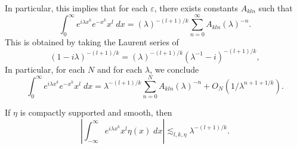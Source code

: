 \begin{remark}
  In particular, this implies that for each $\varepsilon$, there exists constants $A_{kln}$ such that
  \[ \int_0^\infty e^{i \lambda x^k} e^{-x^k} x^l\; dx = (\lambda)^{-(l+1)/k} \sum_{n = 0}^\infty A_{kln} (\lambda)^{-n}. \]
  This is obtained by taking the Laurent series of
  \[ (1 - i \lambda)^{-(l+1)/k} = (\lambda)^{-(l+1)/k} (\lambda^{-1} - i)^{-(l+1)/k}, \]
  In particular, for each $N$ and for each $\lambda$, we conclude
  \[ \int_0^\infty e^{i \lambda x^k} e^{-x^k} x^l\; dx = \lambda^{-(l+1)/k} \sum_{n = 0}^N A_{kln} (\lambda)^{-n} + O_N \left(1/\lambda^{n + 1 + 1/k} \right). \]
\end{remark}

\begin{lemma}
  If $\eta$ is compactly supported and smooth, then
  \[ \left| \int_{-\infty}^\infty e^{i \lambda x^k} x^l \eta(x)\; dx \right| \lesssim_{l,k,\eta} \lambda^{-(l + 1)/k}. \]
\end{lemma}
